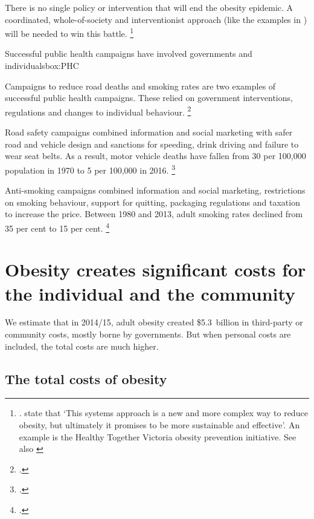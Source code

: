 \documentclass[embargoed]{grattan}
\begin{document}
There is no single policy or intervention that will end the obesity epidemic.
A coordinated, whole-of-society and interventionist approach (like the examples in ) will be needed to win this battle.%
\footnote{\textcites{Sassi2016Taxingsugar}{Karnani2016ObesityCrisisas}{Huang2009systemsorientedmultilevel}. \textcite{Swinburn2013Progressobesityprevention} state that `This systems approach is a new and more complex way to reduce obesity, but ultimately it promises to be more sustainable and effective'.
An example is the Healthy Together Victoria obesity prevention initiative.
See also \textcites{Mckinsey2014overcomingobesity}{Health2016Insufficientphysicalactivity}}

\begin{smallbox}{Successful public health campaigns have involved governments and individuals}{box:PHC}

Campaigns to reduce road deaths and smoking rates are two examples of successful public health campaigns.
These relied on government interventions, regulations and changes to individual behaviour.%
\footcite{MacKay2011Legislativesolutionsunhealthy}

Road safety campaigns combined information and social marketing with safer road and vehicle design and sanctions for speeding, drink driving and failure to wear seat belts.
As a result, motor vehicle deaths have fallen from 30 per 100,000 population in 1970 to 5 per 100,000 in 2016.%
\footcites{BITRE2016Roaddeaths}{BITRE2010RoaddeathsAustralia}

Anti-smoking campaigns combined information and social marketing, restrictions on smoking behaviour, support for quitting, packaging regulations and taxation to increase the price.
Between 1980 and 2013, adult smoking rates declined from 35 per cent to 15 per cent.%
\footcite{Scollo2016TobaccoAustraliaFacts}
\end{smallbox}

\chapter{Obesity creates significant costs for the individual and the community}\label{obesity-creates-significant-costs-for-the-individual-and-society}

We estimate that in 2014/15, adult obesity created \$5.3~billion in third-party or community costs, mostly borne by governments.
But when personal costs are included, the total costs are much higher.

\section{The total costs of obesity }\label{the-total-costs-of-obesity}
\end{document}
